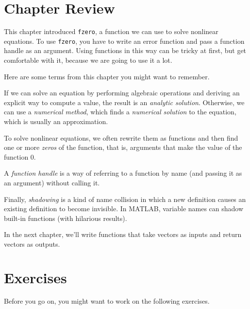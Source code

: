 \section{Chapter Review}

This chapter introduced \lstinline{fzero}, a function we can use to solve nonlinear equations.
To use \lstinline{fzero}, you have to write an error function and pass a function handle as an argument.  Using functions in this way can be tricky at first, but get comfortable with it, because we are going to use it a lot.

Here are some terms from this chapter you might want to remember.

If we can solve an equation by performing algebraic operations and deriving an explicit way to compute a value, the result is an \emph{analytic solution}.
Otherwise, we can use a \emph{numerical method}, which finds a \emph{numerical solution} to the equation, which is usually an approximation.

To solve nonlinear equations, we often rewrite them as functions and then find one or more \emph{zeros} of the function, that is, arguments that make the value of the function $0$.

A \emph{function handle} is a way of
referring to a function by name (and passing it as an argument)
without calling it.

Finally, \emph{shadowing} is a kind of name collision in which a new definition
causes an existing definition to become invisible.  In MATLAB,
variable names can shadow built-in functions (with hilarious results).

In the next chapter, we'll write functions that take vectors as inputs and return vectors as outputs.


\section{Exercises}

Before you go on, you might want to work on the following exercises.

